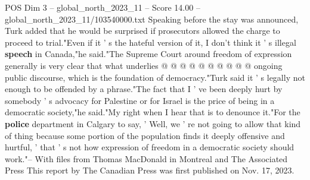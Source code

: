 \begin{textsample}{POS Dim 3 – global\_north\_2023\_11 – Score 14.00 – global\_north\_2023\_11/103540000.txt}
Speaking before the stay was announced, Turk added that he would be surprised if prosecutors allowed the charge to proceed to trial."Even if it ' s the hateful version of it, I don't think it ' s illegal \textbf{speech} in Canada,"he said."The Supreme Court around freedom of expression generally is very clear that what underlies @ @ @ @ @ @ @ @ @ @ ongoing public discourse, which is the foundation of democracy."Turk said it ' s legally not enough to be offended by a phrase."The fact that I ' ve been deeply hurt by somebody ' s advocacy for Palestine or for Israel is the price of being in a democratic society,"he said."My right when I hear that is to denounce it."For the \textbf{police} department in Calgary to say, ' Well, we ' re not going to allow that kind of thing because some portion of the population finds it deeply offensive and hurtful, ' that ' s not how expression of freedom in a democratic society should work."-- With files from Thomas MacDonald in Montreal and The Associated Press This report by The Canadian Press was first published on Nov. 17, 2023.

\end{textsample}
